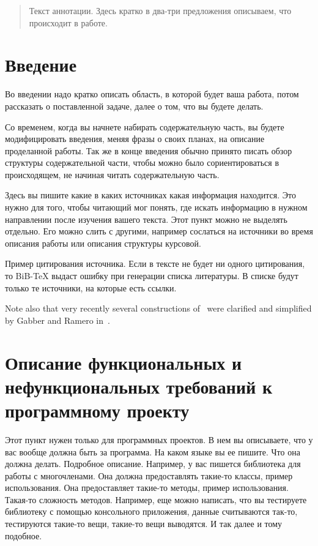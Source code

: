 \documentclass{article}
\begin{document}
\makeTitlePage

\tableofcontents

\begin{abstract}
Текст аннотации. Здесь кратко в два-три предложения описываем, что происходит в работе.
\end{abstract}


\section{Введение}

Во введении надо кратко описать область, в которой будет ваша работа, потом рассказать о поставленной задаче, далее о том, что вы будете делать.


Со временем, когда вы начнете набирать содержательную часть, вы будете модифицировать введения, меняя фразы о своих планах, на описание проделанной работы. Так же в конце введения обычно принято писать обзор структуры содержательной части, чтобы можно было сориентироваться в происходящем, не начиная читать содержательную часть.

Здесь вы пишите какие в каких источниках какая информация находится. Это нужно для того, чтобы читающий мог понять, где искать информацию в нужном направлении после изучения вашего текста. Этот пункт можно не выделять отдельно. Его можно слить с другими, например сослаться на источники во время описания работы или описания структуры курсовой.

Пример цитирования источника. Если в тексте не будет ни одного цитирования, то BiB-TeX выдаст ошибку при генерации списка литературы. В списке будут только те источники, на которые есть ссылки.

Note also that very recently several constructions of~\cite{Elkik73} were clarified and simplified by Gabber and Ramero in~\cite[Chapter~5]{GabRam}.

\section{Описание функциональных и нефункциональных требований к программному проекту}

Этот пункт нужен только для программных проектов. В нем вы описываете, что у вас вообще должна быть за программа. На каком языке вы ее пишите. Что она должна делать. Подробное описание. Например, у вас пишется библиотека для работы с многочленами. Она должна предоставлять такие-то классы, пример использования. Она предоставляет такие-то методы, пример использования. Такая-то сложность методов. Например, еще можно написать, что вы тестируете библиотеку с помощью консольного приложения, данные считываются так-то, тестируются такие-то вещи, такие-то вещи выводятся. И так далее и тому подобное.
\end{document}
